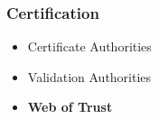 \documentclass{beamer}
\begin{document}
\begin{frame}\frametitle{Certification}
  	\begin{itemize} 
		\item Certificate Authorities
		\item Validation Authorities
		\item \textbf{Web of Trust}
	\end{itemize}

	\end{frame}
\end{document}
